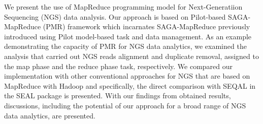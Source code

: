 \documentclass{sig-alternate}
\begin{document}
\maketitle
\begin{abstract} 



 
\end{abstract}

We present the use of MapReduce programming model for Next-Generatiion Sequencing (NGS) data analysis.  Our approach is based on Pilot-based SAGA-MapReduce (PMR) framework which incarnates SAGA-MapReduce previously introduced using Pilot model-based task and data management. As an example demonstrating the capacity of PMR for NGS data analytics, we examined the analysis that carried out NGS reads alignment and duplicate removal, assigned to the map phase and the reduce phase task, respectively.  We compared our implementation with other conventional approaches for NGS that are based on MapReduce with Hadoop and specifically, the direct comparison with SEQAL in the SEAL package is presented.  With our findings from obtained results, discussions, including the potential of our approach for a broad range of NGS data analytics, are presented. 


 





\end{document}
